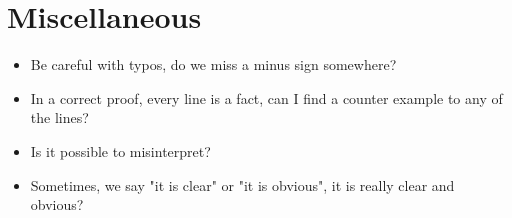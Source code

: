 \documentclass{article}
\begin{document}
\section*{Miscellaneous}
\begin{itemize}
    \item Be careful with typos, do we miss a minus sign somewhere?
    \item In a correct proof, every line is a fact, can I find a counter example to any of the lines?
    \item Is it possible to misinterpret?
    \item Sometimes, we say "it is clear" or "it is obvious", it is really clear and obvious?
\end{itemize}
\end{document}
